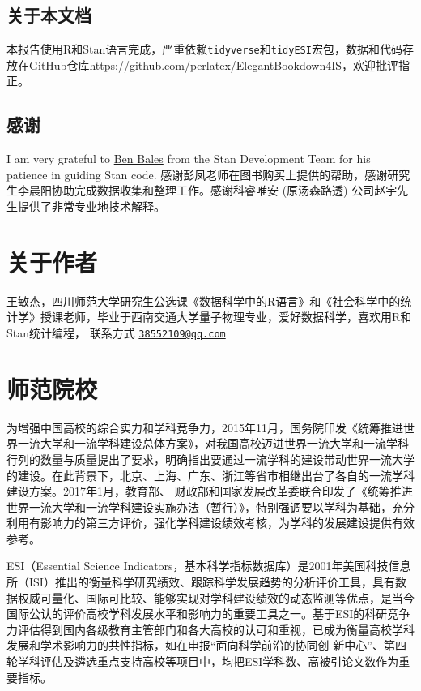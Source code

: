 \documentclass[cn, 11pt, fancy, hide]{elegantbook}
\begin{document}
\hypertarget{ux5173ux4e8eux672cux6587ux6863}{%
\section*{关于本文档}\label{ux5173ux4e8eux672cux6587ux6863}}

本报告使用R和Stan语言完成，严重依赖\texttt{tidyverse}和\texttt{tidyESI}宏包，数据和代码存放在GitHub仓库\url{https://github.com/perlatex/ElegantBookdown4IS}，欢迎批评指正。

\hypertarget{ux611fux8c22}{%
\section*{感谢}\label{ux611fux8c22}}

I am very grateful to \href{https://github.com/bbbales2}{Ben Bales} from the Stan Development Team for his patience in guiding Stan code.
感谢彭凤老师在图书购买上提供的帮助，感谢研究生李晨阳协助完成数据收集和整理工作。感谢科睿唯安 (原汤森路透) 公司赵宇先生提供了非常专业地技术解释。

\hypertarget{author}{%
\chapter*{关于作者}\label{author}}

王敏杰，四川师范大学研究生公选课《数据科学中的R语言》和《社会科学中的统计学》授课老师，毕业于西南交通大学量子物理专业，爱好数据科学，喜欢用R和Stan统计编程，
联系方式 \href{mailto:38552109@qq.com}{\nolinkurl{38552109@qq.com}}

\hypertarget{bigdata}{%
\chapter{师范院校}\label{bigdata}}

为增强中国高校的综合实力和学科竞争力，2015年11月，国务院印发《统筹推进世界一流大学和一流学科建设总体方案》，对我国高校迈进世界一流大学和一流学科行列的数量与质量提出了要求，明确指出要通过一流学科的建设带动世界一流大学的建设。在此背景下，北京、上海、广东、浙江等省市相继出台了各自的一流学科建设方案。2017年1月，教育部、
财政部和国家发展改革委联合印发了《统筹推进世界一流大学和一流学科建设实施办法（暂行）》，特别强调要以学科为基础，充分利用有影响力的第三方评价，强化学科建设绩效考核，为学科的发展建设提供有效参考。

ESI（Essential Science Indicators，基本科学指标数据库）是2001年美国科技信息所（ISI）推出的衡量科学研究绩效、跟踪科学发展趋势的分析评价工具，具有数据权威可量化、国际可比较、能够实现对学科建设绩效的动态监测等优点，是当今国际公认的评价高校学科发展水平和影响力的重要工具之一。基于ESI的科研竞争力评估得到国内各级教育主管部门和各大高校的认可和重视，已成为衡量高校学科发展和学术影响力的共性指标，如在申报``面向科学前沿的协同创
新中心''、第四轮学科评估及遴选重点支持高校等项目中，均把ESI学科数、高被引论文数作为重要指标。
\end{document}

